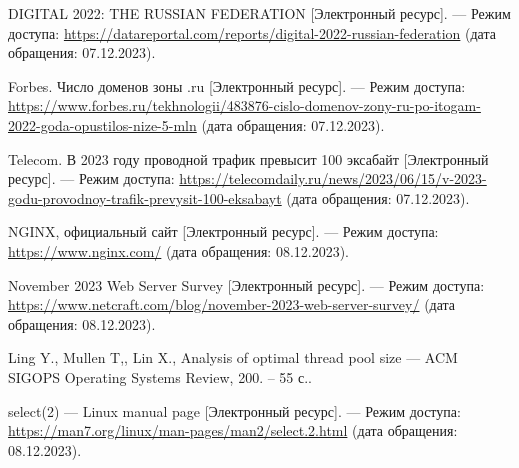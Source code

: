 \begin{thebibliography}{}
	DIGITAL 2022: THE RUSSIAN FEDERATION [Электронный ресурс]. --- Режим доступа: \url{https://datareportal.com/reports/digital-2022-russian-federation} (дата обращения: 07.12.2023).
	
	Forbes. Число доменов зоны .ru [Электронный ресурс]. --- Режим доступа: \url{https://www.forbes.ru/tekhnologii/483876-cislo-domenov-zony-ru-po-itogam-2022-goda-opustilos-nize-5-mln} (дата обращения: 07.12.2023).
	

	Telecom. В 2023 году проводной трафик превысит 100 эксабайт [Электронный ресурс]. --- Режим доступа: \url{https://telecomdaily.ru/news/2023/06/15/v-2023-godu-provodnoy-trafik-prevysit-100-eksabayt} (дата обращения: 07.12.2023).

	NGINX, официальный сайт [Электронный ресурс]. --- Режим доступа: \url{https://www.nginx.com/} (дата обращения: 08.12.2023).

	November 2023 Web Server Survey [Электронный ресурс]. --- Режим доступа: \url{https://www.netcraft.com/blog/november-2023-web-server-survey/} (дата обращения: 08.12.2023).
	
	Ling Y., Mullen T,, Lin X., Analysis of optimal thread pool size --- ACM SIGOPS Operating Systems Review, 200. -- 55 с..
	
	select(2) — Linux manual page [Электронный ресурс]. --- Режим доступа: \url{https://man7.org/linux/man-pages/man2/select.2.html} (дата обращения: 08.12.2023).
	
%	
%
%	
%
%	
%	


\end{thebibliography}
